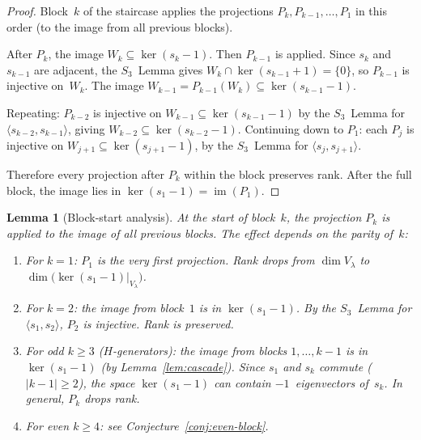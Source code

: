 \documentclass[12pt]{article}
\newtheorem{lemma}[theorem]{Lemma}
\theoremstyle{definition}
\theoremstyle{remark}
\begin{document}
\begin{proof}
Block~$k$ of the staircase applies the projections $P_k, P_{k-1}, \ldots, P_1$
in this order (to the image from all previous blocks).

After $P_k$, the image $W_k \subseteq \ker(s_k - 1)$.  Then $P_{k-1}$ is applied.
Since $s_k$ and $s_{k-1}$ are adjacent, the $S_3$~Lemma gives
$W_k \cap \ker(s_{k-1} + 1) = \{0\}$, so $P_{k-1}$ is injective on~$W_k$.
The image $W_{k-1} = P_{k-1}(W_k) \subseteq \ker(s_{k-1} - 1)$.

Repeating: $P_{k-2}$ is injective on $W_{k-1} \subseteq \ker(s_{k-1} - 1)$ by the
$S_3$~Lemma for $\langle s_{k-2}, s_{k-1}\rangle$, giving
$W_{k-2} \subseteq \ker(s_{k-2} - 1)$.  Continuing down to $P_1$:
each $P_j$ is injective on $W_{j+1} \subseteq \ker(s_{j+1} - 1)$, by the $S_3$~Lemma
for $\langle s_j, s_{j+1}\rangle$.

Therefore every projection after $P_k$ within the block preserves rank.  After the
full block, the image lies in $\ker(s_1 - 1) = \operatorname{im}(P_1)$.
\end{proof}

\begin{lemma}[Block-start analysis]
\label{lem:block-start}
At the start of block~$k$, the projection $P_k$ is applied to the image of all
previous blocks.  The effect depends on the parity of~$k$:

\begin{enumerate}
\item[\textup{(i)}] For $k = 1$: $P_1$ is the very first projection.  Rank drops from
$\dim V_\lambda$ to $\dim\!\bigl(\ker(s_1 - 1)|_{V_\lambda}\bigr)$.

\item[\textup{(ii)}] For $k = 2$: the image from block~$1$ is in $\ker(s_1 - 1)$.
By the $S_3$~Lemma for $\langle s_1, s_2 \rangle$, $P_2$ is injective.
Rank is preserved.

\item[\textup{(iii)}] For odd $k \ge 3$ \textup{(}$H$-generators\textup{)}: the image
from blocks $1, \ldots, k{-}1$ is in $\ker(s_1 - 1)$ (by Lemma~\ref{lem:cascade}).
Since $s_1$ and $s_k$ commute ($|k - 1| \ge 2$), the space $\ker(s_1 - 1)$ can
contain $-1$~eigenvectors of~$s_k$.  In general, $P_k$ \emph{drops} rank.

\item[\textup{(iv)}] For even $k \ge 4$: see Conjecture~\ref{conj:even-block}.
\end{enumerate}
\end{lemma}
\end{document}
